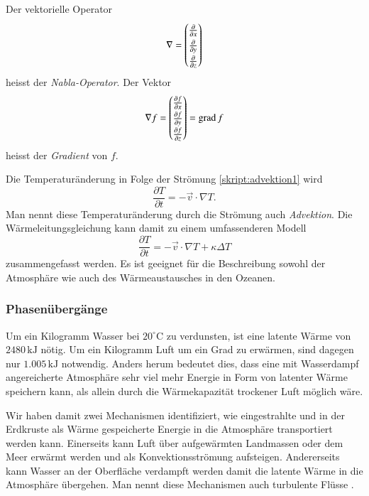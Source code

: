 \begin{definition}
Der vektorielle Operator 
\[
\nabla
=
\def\arraystretch{1.3}
\begin{pmatrix}
\frac{\partial}{\partial x}\\
\frac{\partial}{\partial y}\\
\frac{\partial}{\partial z}
\end{pmatrix}
\]
heisst der {\em Nabla-Operator}.
Der Vektor
\[
\nabla f
=
\def\arraystretch{1.3}
\begin{pmatrix}
\frac{\partial f}{\partial x}\\
\frac{\partial f}{\partial y}\\
\frac{\partial f}{\partial z}
\end{pmatrix}
=
\operatorname{grad} f
\]
heisst der {\em Gradient} von $f$.
\end{definition}
%
%

Die Temperaturänderung in Folge der Strömung 
\eqref{skript:advektion1}
wird 
\begin{equation}
\frac{\partial T}{\partial t}
=
-\vec{v}\cdot\nabla T.
\label{skript:advektion2}
\end{equation}
%
Man nennt diese Temperaturänderung durch die Strömung auch
{\em Advektion}.
Die Wärmeleitungsgleichung kann damit zu einem umfassenderen
Modell
\begin{equation}
\frac{\partial T}{\partial t}
=
-\vec{v}\cdot\nabla T +\kappa\Delta T
\label{skript:waermeleitungadvektion}
\end{equation}
zusammengefasst werden.
Es ist geeignet für die Beschreibung sowohl der Atmosphäre wie auch des
Wärmeaustausches in den Ozeanen.

\subsubsection{Phasenübergänge}
Um ein Kilogramm Wasser bei $20^\circ\text{C}$ zu verdunsten, ist eine
latente Wärme von $2480\,\text{kJ}$ nötig.
Um ein Kilogramm Luft um ein Grad zu erwärmen, sind dagegen nur
$1.005\,\text{kJ}$ notwendig.
Anders herum bedeutet dies, dass eine mit Wasserdampf angereicherte Atmosphäre
sehr viel mehr Energie in Form von latenter Wärme speichern kann, als
allein durch die Wärmekapazität trockener Luft möglich wäre.

Wir haben damit zwei Mechanismen identifiziert, wie eingestrahlte
und in der Erdkruste als Wärme gespeicherte Energie in die Atmosphäre 
transportiert werden kann.
Einerseits kann Luft über aufgewärmten Landmassen oder dem Meer erwärmt
werden und als Konvektionsströmung aufsteigen.
Andererseits kann Wasser an der Oberfläche verdampft werden damit die
latente Wärme in die Atmosphäre übergehen.
Man nennt diese Mechanismen auch turbulente Flüsse
\cite[S.~70]{skript:wiefunktioniertdas}.

